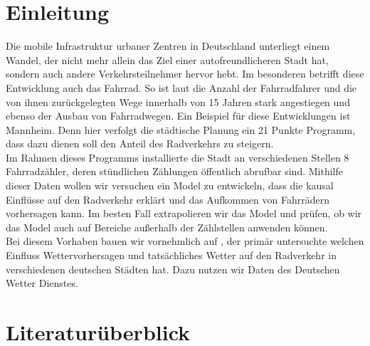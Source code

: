 \documentclass[a4paper,12pt]{thesis}
\begin{document}
\begingroup
\let\clearpage\relax
\listoffigures
\listoftables
\endgroup






\chapter{Einleitung}

Die mobile Infrastruktur urbaner Zentren in Deutschland unterliegt einem Wandel, der nicht mehr allein das Ziel einer autofreundlicheren Stadt hat, sondern auch andere Verkehrsteilnehmer hervor hebt. Im besonderen betrifft diese Entwicklung auch das Fahrrad. So ist laut \cite{Nobis2019} die Anzahl der Fahrradfahrer und die von ihnen zurückgelegten Wege innerhalb von 15 Jahren stark angestiegen und ebenso der Ausbau von Fahrradwegen. Ein Beispiel für diese Entwicklungen ist Mannheim. Denn hier verfolgt die städtische Planung ein 21 Punkte Programm, dass dazu dienen soll den Anteil des Radverkehrs zu steigern.\\
Im Rahmen dieses Programms installierte die Stadt an verschiedenen Stellen 8 Fahrradzähler, deren stündlichen Zählungen öffentlich abrufbar sind. Mithilfe dieser Daten wollen wir versuchen ein Model zu entwickeln, dass die kausal Einflüsse auf den Radverkehr erklärt und das Aufkommen von Fahrrädern vorhersagen kann. Im besten Fall extrapolieren wir das Model und prüfen, ob wir das Model auch auf Bereiche außerhalb der Zählstellen anwenden können.\\
Bei diesem Vorhaben bauen wir vornehmlich auf \cite{Wessel2020}, der primär untersuchte welchen Einfluss Wettervorhersagen und tatsächliches Wetter auf den Radverkehr in verschiedenen deutschen Städten hat. Dazu nutzen wir Daten des Deutschen Wetter Dienstes.\\

\chapter{Literaturüberblick}
\end{document}
